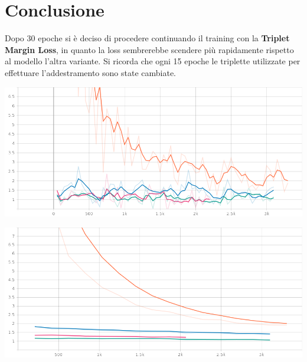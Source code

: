 \documentclass[11pt]{article}
\begin{document}
\pagebreak
\section{Conclusione}

Dopo 30 epoche si è deciso di procedere continuando il training con la \textbf{Triplet Margin Loss}, in quanto la loss
sembrerebbe scendere più rapidamente rispetto al modello l'altra variante. Si ricorda che 
ogni 15 epoche le triplette utilizzate per effettuare l'addestramento sono state cambiate. 

\begin{center}
    \begin{minipage}{0.45\linewidth}
    \includegraphics[width=\linewidth]{train_loss_2.png}
    \end{minipage}
    \begin{minipage}{0.45\linewidth}
    \includegraphics[width=\linewidth]{valid_loss_2.png}
    \end{minipage}
\end{center}
\end{document}
